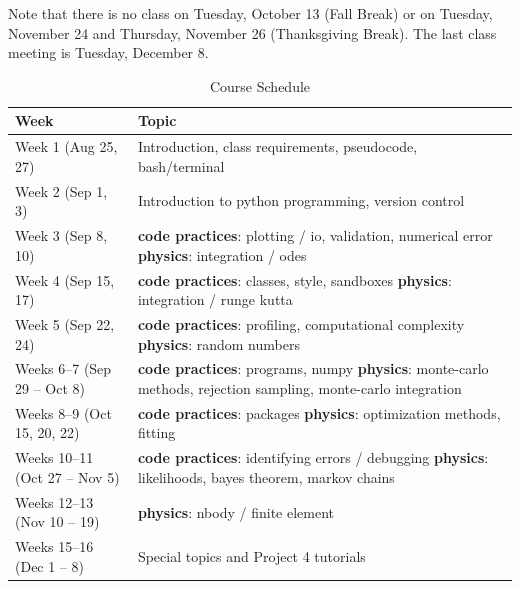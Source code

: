 \documentclass[12pt]{article}
\begin{document}
Note that there is no class on Tuesday, October 13 (Fall Break) or on Tuesday, November 24 and Thursday, November 26 (Thanksgiving Break). The last class meeting is Tuesday, December 8.

\begin{table}[htbp]
  \caption{Course Schedule}
\begin{center}
  \newcommand{\cw}[1]{\raggedright #1\par}
  \newcommand{\tp}[2]{\textbf{code practices}: #1 \newline \textbf{physics}: #2}
  \begin{tabular}{|>{\raggedright\arraybackslash}p{3.4cm}|p{9.0cm}|}
    \hline
    \textbf{Week} & \textbf{Topic} \\\hline
    Week 1 \newline (Aug 25, 27) & Introduction, class requirements, pseudocode, bash/terminal \\\hline
    Week 2 \newline (Sep 1, 3) & Introduction to python programming, version control \\\hline
    Week 3 \newline (Sep 8, 10) & \tp{plotting / io, validation, numerical error}{integration / odes} \\\hline
    Week 4 \newline (Sep 15, 17) & \tp{classes, style, sandboxes}{integration / runge kutta} \\\hline
    Week 5 \newline (Sep 22, 24) & \tp{profiling, computational complexity}{random numbers} \\\hline
    Weeks 6--7 \newline (Sep 29 -- Oct 8) & \tp{programs, numpy}{monte-carlo methods, rejection sampling, monte-carlo integration} \\\hline
    Weeks 8--9 \newline (Oct 15, 20, 22) & \tp{packages}{optimization methods, fitting} \\\hline
    Weeks 10--11 \newline (Oct 27 -- Nov 5) & \tp{identifying errors / debugging}{likelihoods, bayes theorem, markov chains} \\\hline
    Weeks 12--13 \newline (Nov 10 -- 19) & \textbf{physics}: nbody / finite element \\\hline
    Weeks 15--16 \newline (Dec 1 -- 8) & Special topics and Project 4 tutorials \\\hline
  \end{tabular}
\end{center}
\end{table}
\end{document}
